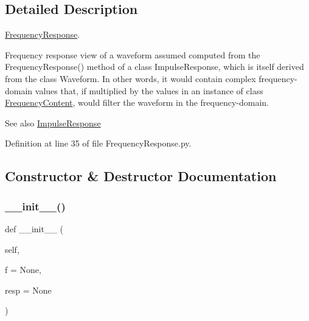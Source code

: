 \subsection{Detailed Description}
\hyperlink{classSignalIntegrity_1_1FrequencyDomain_1_1FrequencyResponse_1_1FrequencyResponse}{Frequency\+Response}. 

Frequency response view of a waveform assumed computed from the Frequency\+Response() method of a class Impulse\+Response, which is itself derived from the class Waveform. In other words, it would contain complex frequency-\/domain values that, if multiplied by the values in an instance of class \hyperlink{namespaceSignalIntegrity_1_1FrequencyDomain_1_1FrequencyContent}{Frequency\+Content}, would filter the waveform in the frequency-\/domain. \begin{DoxySeeAlso}{See also}
\hyperlink{classSignalIntegrity_1_1FrequencyDomain_1_1FrequencyResponse_1_1FrequencyResponse_aa301152e06c3881589eb5c70d53734f6}{Impulse\+Response} 
\end{DoxySeeAlso}


Definition at line 35 of file Frequency\+Response.\+py.



\subsection{Constructor \& Destructor Documentation}
\mbox{\label{classSignalIntegrity_1_1FrequencyDomain_1_1FrequencyResponse_1_1FrequencyResponse_af89c1b84b55a8388acf19c91be67a97e}} 
\subsubsection{\texorpdfstring{\+\_\+\+\_\+init\+\_\+\+\_\+()}{\_\_init\_\_()}}
{\footnotesize\ttfamily def \+\_\+\+\_\+init\+\_\+\+\_\+ (\begin{DoxyParamCaption}\item[{}]{self,  }\item[{}]{f = {\ttfamily None},  }\item[{}]{resp = {\ttfamily None} }\end{DoxyParamCaption})}



